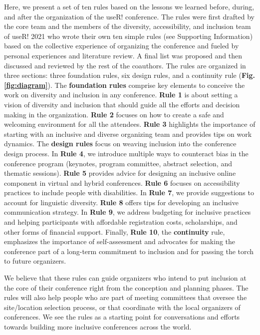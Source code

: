 \documentclass[10pt,letterpaper]{article}
\begin{document}
Here, we present a set of ten rules based on the lessons we learned before, during, and after the organization of the useR! conference.
 The rules were first drafted by the core team and the members of the diversity, accessibility, and inclusion team of useR! 2021 who wrote their own ten simple rules (see Supporting Information) based on the collective experience of organizing the conference and fueled by personal experiences and literature review.
A final list was proposed and then discussed and reviewed by the rest of the coauthors. 
The rules are organized in three sections: three foundation rules, six design rules, and a continuity rule (\textbf{Fig. \ref{fig:diagram}}).
The \textbf{foundation rules} comprise key elements to conceive the work on diversity and inclusion in any conference. 
\textbf{Rule 1} is about setting a vision of diversity and inclusion that should guide all the efforts and decision making in the organization.
\textbf{Rule 2} focuses on how to create a safe and welcoming environment for all the attendees. 
\textbf{Rule 3} highlights the importance of starting with an inclusive and diverse organizing team and provides tips on work dynamics.
The \textbf{design rules} focus on weaving inclusion into the conference design process.
In \textbf{Rule 4}, we introduce multiple ways to counteract bias in the conference program (keynotes, program committee, abstract selection, and thematic sessions). 
\textbf{Rule 5} provides advice for designing an inclusive online component in virtual and hybrid conferences.
\textbf{Rule 6} focuses on accessibility practices to include people with disabilities.
In \textbf{Rule 7}, we provide suggestions to account for linguistic diversity. 
\textbf{Rule 8} offers tips for developing an inclusive communication strategy. 
In \textbf{Rule 9}, we address budgeting for inclusive practices and helping participants with affordable registration costs, scholarships, and other forms of financial support.
Finally, 
\textbf{Rule 10}, the \textbf{continuity} rule, emphasizes the importance of self-assessment and advocates for making the conference part of a long-term commitment to inclusion and for passing the torch to future organizers. 

We believe that these rules can guide organizers who intend to put inclusion at the core of their conference right from the conception and planning phases.
The rules will also help people who are part of meeting committees that oversee the site/location selection process, or that coordinate with the local organizers of conferences. 
We see the rules as a starting point for conversations and efforts towards building more inclusive conferences across the world.
\end{document}
